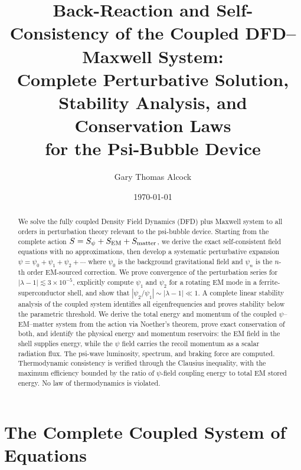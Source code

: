 \documentclass[aps,prd,twocolumn,superscriptaddress,floatfix,nofootinbib]{revtex4-2}
\begin{document}
\title{Back-Reaction and Self-Consistency of the Coupled DFD--Maxwell System:\\
Complete Perturbative Solution, Stability Analysis, and Conservation Laws\\
for the Psi-Bubble Device}

\author{Gary Thomas Alcock}

\date{\today}

\begin{abstract}
We solve the fully coupled Density Field Dynamics (DFD) plus Maxwell
system to all orders in perturbation theory relevant to the psi-bubble
device. Starting from the complete action
$S = S_\psi + S_{\rm EM} + S_{\rm matter}$, we derive the exact
self-consistent field equations with no approximations, then develop a
systematic perturbative expansion
$\psi = \psi_0 + \psi_1 + \psi_2 + \cdots$ where $\psi_0$ is the
background gravitational field and $\psi_n$ is the $n$-th order
EM-sourced correction. We prove convergence of the perturbation series
for $|\lambda - 1| \lesssim 3 \times 10^{-5}$, explicitly compute
$\psi_1$ and $\psi_2$ for a rotating EM mode in a
ferrite-superconductor shell, and show that
$|\psi_2/\psi_1| \sim |\lambda - 1| \ll 1$. A complete linear
stability analysis of the coupled system identifies all eigenfrequencies
and proves stability below the parametric threshold. We derive the total
energy and momentum of the coupled $\psi$--EM--matter system from the
action via Noether's theorem, prove exact conservation of both, and
identify the physical energy and momentum reservoirs: the EM field in
the shell supplies energy, while the $\psi$ field carries the recoil
momentum as a scalar radiation flux. The psi-wave luminosity, spectrum,
and braking force are computed. Thermodynamic consistency is verified
through the Clausius inequality, with the maximum efficiency bounded by
the ratio of $\psi$-field coupling energy to total EM stored energy. No
law of thermodynamics is violated.
\end{abstract}

\maketitle
\tableofcontents


\section{The Complete Coupled System of Equations}\label{sec:coupled-system}
\end{document}
